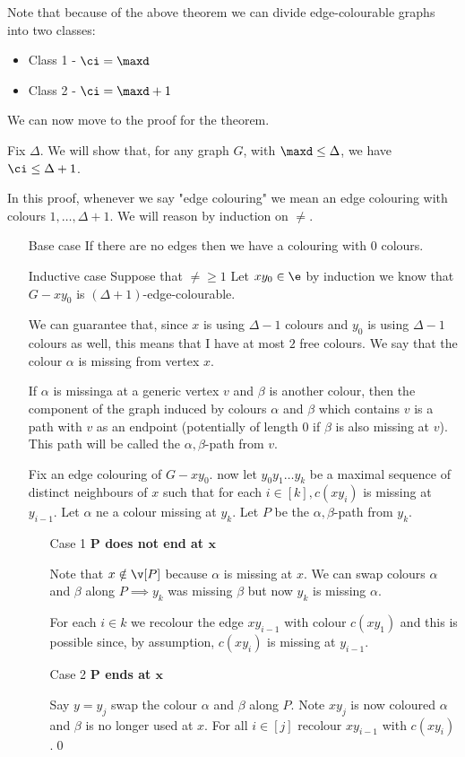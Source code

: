 Note that because of the above theorem we can divide edge-colourable graphs into two classes:
\begin{itemize}
    \item Class 1 - $\ci = \maxd$
    \item Class 2 - $\ci = \maxd + 1$
\end{itemize}
We can now move to the proof for the theorem.
\begin{prf}
    Fix $\Delta$. We will show that, for any graph $G$, with $\maxd \leq \Delta$, we have $\ci \leq \Delta + 1$.

    In this proof, whenever we say "edge colouring" we mean an edge colouring with colours $1, \dots, \Delta + 1$. We will reason by induction on $\ne$.
    \begin{itemize}
        \item[Base case] If there are no edges then we have a colouring with $0$ colours.
        \item[Inductive case] Suppose that $\ne \geq 1$ Let $xy_0 \in \e$ by induction we know that $G - xy_0$ is $(\Delta + 1)$-edge-colourable.
        
        We can guarantee that, since $x$ is using $\Delta - 1$ colours and $y_0$ is using $\Delta - 1$ colours as well, this means that I have at most $2$ free colours. We say that the colour $\alpha$ is missing from vertex $x$.

        If $\alpha$ is missinga at a generic vertex $v$ and $\beta$ is another colour, then the component of the graph induced by colours $\alpha$ and $\beta$ which contains $v$ is a path with $v$ as an endpoint (potentially of length $0$ if $\beta$ is also missing at $v$). This path will be called the $\alpha,\beta$-path from $v$.

        Fix an edge colouring of $G - xy_0$. now let $y_0y_1\dots y_k$ be a maximal sequence of distinct neighbours of $x$ such that for each $i \in [k], c(xy_i)$ is missing at $y_{i - 1}$. Let $\alpha$ ne a colour missing at $y_k$. Let $P$ be the $\alpha, \beta$-path from $y_k$.
        \begin{itemize}
            \item[Case 1] \textbf{$\bm{P}$ does not end at $\bm{x}$}
            
            Note that $x \notin \v[P]$ because $\alpha$ is missing at $x$. We can swap colours $\alpha$ and $\beta$ along $P \implies y_k$ was missing $\beta$ but now $y_k$ is missing $\alpha$.

            For each $i \in k$ we recolour the edge $xy_{i - 1}$ with colour $c(xy_1)$ and this is possible since, by assumption, $c(xy_i)$ is missing at $y_{i - 1}$.
            \item[Case 2] \textbf{$\bm{P}$ ends at $\bm{x}$}
            
            Say $y = y_j$ swap the colour $\alpha$ and $\beta$ along $P$. Note $xy_j$ is now coloured $\alpha$ and $\beta$ is no longer used at $x$. For all $i \in [j]$ recolour $xy_{i - 1}$ with $c(xy_i)$.\qed
        \end{itemize}
    \end{itemize}
\end{prf}
